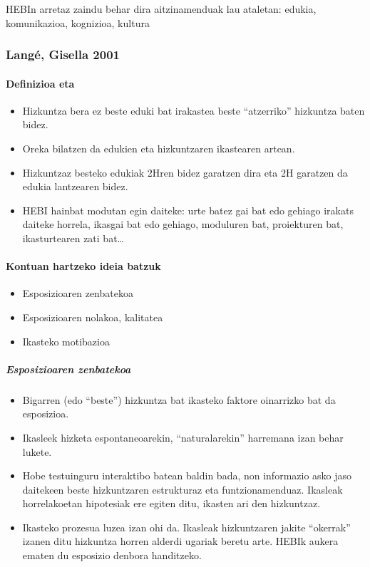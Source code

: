 \documentclass[
]{book}
\providecommand{\tightlist}{%
  \setlength{\itemsep}{0pt}\setlength{\parskip}{0pt}}
\begin{document}
HEBIn arretaz zaindu behar dira aitzinamenduak lau ataletan: edukia, komunikazioa, kognizioa, kultura

\hypertarget{languxe9-gisella-2001}{%
\subsubsection{Langé, Gisella 2001}\label{languxe9-gisella-2001}}

\hypertarget{definizioa-eta}{%
\paragraph{Definizioa eta}\label{definizioa-eta}}

\begin{itemize}
\tightlist
\item
  Hizkuntza bera ez beste eduki bat irakastea beste ``atzerriko'' hizkuntza baten bidez.
\item
  Oreka bilatzen da edukien eta hizkuntzaren ikastearen artean.
\item
  Hizkuntzaz besteko edukiak 2Hren bidez garatzen dira eta 2H garatzen da edukia lantzearen bidez.
\item
  HEBI hainbat modutan egin daiteke: urte batez gai bat edo gehiago irakats daiteke horrela, ikasgai bat edo gehiago, moduluren bat, proiekturen bat, ikasturtearen zati bat\ldots{}
\end{itemize}

\hypertarget{kontuan-hartzeko-ideia-batzuk}{%
\paragraph{Kontuan hartzeko ideia batzuk}\label{kontuan-hartzeko-ideia-batzuk}}

\begin{itemize}
\tightlist
\item
  Esposizioaren zenbatekoa
\item
  Esposizioaren nolakoa, kalitatea
\item
  Ikasteko motibazioa
\end{itemize}

\hypertarget{esposizioaren-zenbatekoa}{%
\subparagraph{Esposizioaren zenbatekoa}\label{esposizioaren-zenbatekoa}}

\begin{itemize}
\tightlist
\item
  Bigarren (edo ``beste'') hizkuntza bat ikasteko faktore oinarrizko bat da esposizioa.
\item
  Ikasleek hizketa espontaneoarekin, ``naturalarekin'' harremana izan behar lukete.
\item
  Hobe testuinguru interaktibo batean baldin bada, non informazio asko jaso daitekeen beste hizkuntzaren estrukturaz eta funtzionamenduaz. Ikasleak horrelakoetan hipotesiak ere egiten ditu, ikasten ari den hizkuntzaz.
\item
  Ikasteko prozesua luzea izan ohi da. Ikasleak hizkuntzaren jakite ``okerrak'' izanen ditu hizkuntza horren alderdi ugariak beretu arte. HEBIk aukera ematen du esposizio denbora handitzeko.
\end{itemize}
\end{document}
